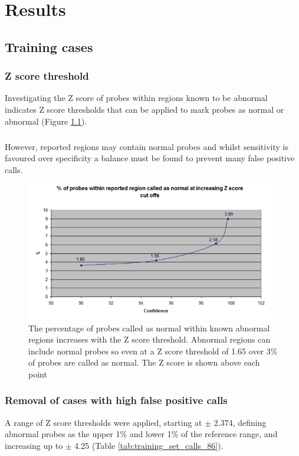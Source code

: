 \chapter{Results}\label{ch:Results} 
\section{Training cases}
\subsection{Z score threshold}
Investigating the Z score of probes within regions known to be abnormal indicates Z score thresholds that can be applied to mark probes as normal or abnormal (Figure \ref{fig:probeswithinreportedregion}). 
\paragraph*{}
However, reported regions may contain normal probes and whilst sensitivity is favoured over specificity a balance must be found to prevent many false positive calls.

\begin{figure}[h]
\centering
\includegraphics[width=0.9\linewidth]{./Figures/probeswithinreportedregion}
\caption[The number of probes classified as normal within known regions of CNV at a range of Z score thresholds]{The percentage of probes called as normal within known abnormal regions increases with the Z score threshold. Abnormal regions can include normal probes so even at a Z score threshold of 1.65 over 3\% of probes are called as normal. The Z score is shown above each point}
\label{fig:probeswithinreportedregion}
\end{figure}


\subsection{Removal of cases with high false positive calls}
A range of Z score thresholds were applied, starting at $\pm  $ 2.374,  defining abnormal probes as the upper 1\% and lower 1\% of the reference range, and increasing up to $\pm $ 4.25 (Table \ref{tab:training_set_calls_86}).

